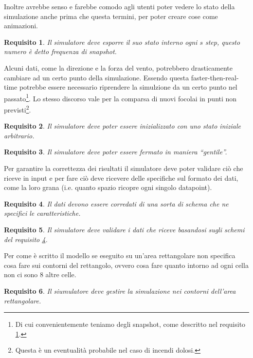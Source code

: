 \documentclass[draft]{article}
\newcommand{\eng}[1]{\foreignlanguage{english}{#1}} %
\newtheorem{requirement}{Requisito}
\begin{document}
Inoltre avrebbe senso e farebbe comodo agli utenti poter vedere lo stato della
simulazione anche prima che questa termini, per poter creare cose come
animazioni.

\begin{requirement}\label{thm:snapshot}
Il simulatore deve esporre il suo stato interno ogni $s$ step, questo numero è
detto frequenza di \eng{snapshot}.
\end{requirement}

Alcuni dati, come la direzione e la forza del vento, potrebbero drasticamente
cambiare ad un certo punto della simulazione. Essendo questa
\eng{faster-then-real-time} potrebbe essere necessario riprendere la
simulzione da un certo punto nel passato\footnote{Di cui convenientemente
teniamo degli \eng{snapshot}, come descritto nel requisito \ref{thm:snapshot}.}.
Lo stesso discorso vale per la comparsa di nuovi focolai in punti non
previsti\footnote{Questa è un eventualità probabile nel caso di incendi dolosi.}.

\begin{requirement}
Il simulatore deve poter essere inizializzato con uno stato iniziale arbitrario.
\end{requirement}

\begin{requirement}\label{thm:termination}
Il simulatore deve poter essere fermato in maniera ``gentile''.
\end{requirement}

Per garantire la correttezza dei risultati il simulatore deve poter validare
ciò che riceve in \eng{input} e per fare ciò deve ricevere delle specifiche sul
formato dei dati, come la loro grana (i.e. quanto spazio ricopre ogni singolo
\eng{datapoint}).

\begin{requirement}\label{thm:schema}
Il dati devono essere corredati di una sorta di schema che ne specifici le
caratteristiche.
\end{requirement}

\begin{requirement}
Il simulatore deve validare i dati che riceve basandosi sugli schemi del
requisito \ref{thm:schema}.
\end{requirement}

Per come è scritto il modello se eseguito su un'area rettangolare non specifica
cosa fare sui contorni del rettangolo, ovvero cosa fare quanto intorno ad ogni
cella non ci sono 8 altre celle.

\begin{requirement}\label{thm:boundary}
Il siumulatore deve gestire la simulazione nei contorni dell'area rettangolare.
\end{requirement}
\end{document}
